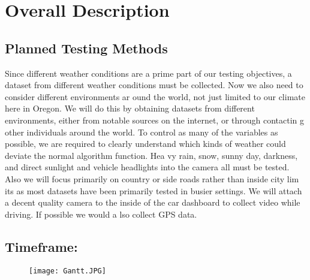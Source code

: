 \documentclass[letterpaper,10pt]{article}
\begin{document}
\section{Overall Description}
    \subsection{Planned Testing Methods}

    Since different weather conditions are a prime part of our testing objectives, a dataset from different weather conditions must be collected. Now we also need to consider different environments ar    ound the world, not just limited to our climate here in Oregon. We will do this by obtaining datasets from different environments, either from notable sources on the internet, or through contactin    g other individuals around the world. To control as many of the variables as possible, we are required to clearly understand which kinds of weather could deviate the normal algorithm function. Hea    vy rain, snow, sunny day, darkness, and direct sunlight and vehicle headlights into the camera all must be tested. Also we will focus primarily on country or side roads rather than inside city lim    its as most datasets have been primarily tested in busier settings. We will attach a decent quality camera to the inside of the car dashboard to collect video while driving. If possible we would a    lso collect GPS data.

    \subsection{Timeframe:}
    \begin{figure}[H] 
        \centering
        \texttt{[image: Gantt.JPG]}
    \end{figure}
\end{document}
